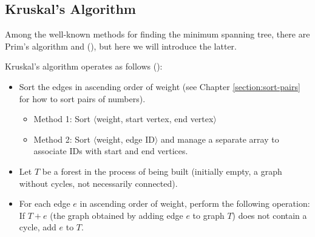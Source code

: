 \subsection{Kruskal's Algorithm}

Among the well-known methods for finding the minimum spanning tree, there are Prim's algorithm and  (), but here we will introduce the latter.

Kruskal's algorithm operates as follows (\pccbook[pp.~101--]):
\begin{itemize}
\setlength{\itemsep}{0pt}
    \item Sort the edges in ascending order of weight (see Chapter \ref{section:sort-pairs} for how to sort pairs of numbers).
    \begin{itemize}
        \item Method 1: Sort $\langle$weight, start vertex, end vertex$\rangle$
        \item Method 2: Sort $\langle$weight, edge ID$\rangle$ and manage a separate array to associate IDs with start and end vertices.
    \end{itemize}
    \item Let $T$ be a forest in the process of being built (initially empty, a graph without cycles, not necessarily connected).
    \item For each edge $e$ in ascending order of weight, perform the following operation:
    If $T+e$ (the graph obtained by adding edge $e$ to graph $T$) does not contain a cycle, add $e$ to $T$.
\end{itemize}

